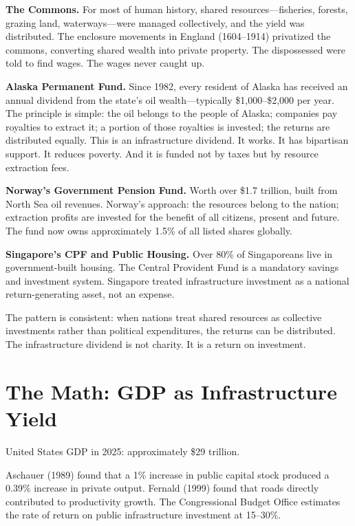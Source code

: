 \documentclass[11pt,letterpaper]{article}
\begin{document}
\textbf{The Commons.} For most of human history, shared resources---fisheries, forests, grazing land, waterways---were managed collectively, and the yield was distributed. The enclosure movements in England (1604--1914) privatized the commons, converting shared wealth into private property. The dispossessed were told to find wages. The wages never caught up.

\textbf{Alaska Permanent Fund.} Since 1982, every resident of Alaska has received an annual dividend from the state's oil wealth---typically \$1,000--\$2,000 per year. The principle is simple: the oil belongs to the people of Alaska; companies pay royalties to extract it; a portion of those royalties is invested; the returns are distributed equally. This is an infrastructure dividend. It works. It has bipartisan support. It reduces poverty. And it is funded not by taxes but by resource extraction fees.

\textbf{Norway's Government Pension Fund.} Worth over \$1.7 trillion, built from North Sea oil revenues. Norway's approach: the resources belong to the nation; extraction profits are invested for the benefit of all citizens, present and future. The fund now owns approximately 1.5\% of all listed shares globally.

\textbf{Singapore's CPF and Public Housing.} Over 80\% of Singaporeans live in government-built housing. The Central Provident Fund is a mandatory savings and investment system. Singapore treated infrastructure investment as a national return-generating asset, not an expense.

The pattern is consistent: when nations treat shared resources as collective investments rather than political expenditures, the returns can be distributed. The infrastructure dividend is not charity. It is a return on investment.

\section{The Math: GDP as Infrastructure Yield}

United States GDP in 2025: approximately \$29 trillion.

Aschauer (1989) found that a 1\% increase in public capital stock produced a 0.39\% increase in private output. Fernald (1999) found that roads directly contributed to productivity growth. The Congressional Budget Office estimates the rate of return on public infrastructure investment at 15--30\%.
\end{document}
